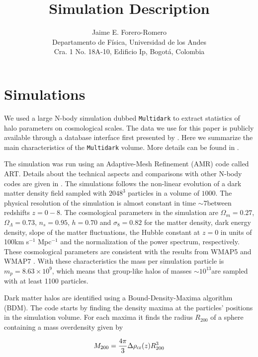 \documentclass{article}
\title{Simulation Description}
\author{Jaime E. Forero-Romero\\ Departamento de F\'{i}sica, Universidad de los Andes\\ Cra. 1 No. 18A-10, Edificio Ip, Bogot\'a, Colombia}
\newcommand{\hMsun}{{\ifmmode{h^{-1}{\rm {M_{\odot}}}}\else{$h^{-1}{\rm{M_{\odot}}}$}\fi}}
\newcommand{\hMpc}{{\ifmmode{h^{-1}{\rm Mpc}}\else{$h^{-1}$Mpc }\fi}}
\newcommand{\hkpc}{{\ifmmode{h^{-1}{\rm kpc}}\else{$h^{-1}$kpc }\fi}}
\begin{document}
\maketitle




   
\section{Simulations}\label{Simulations}

We used a large N-body simulation dubbed \verb"Multidark"
to extract statistics of halo parameters on cosmological scales. The
data we use for this paper is publicly available through a database
interface first presented by \cite{Riebe11}. Here we summarize the
main characteristics of the \verb"Multidark" volume. More details can
be found in \cite{Prada12}.  

The simulation was run using  an Adaptive-Mesh Refinement (AMR) code
called ART. Details about the technical aspects and comparisons with
other N-body codes are given in \cite{Klypin09}.   The simulations
follows the non-linear evolution of a dark matter density field
sampled with $2048^3$ particles in a volume of $1000$\hMpc. The
physical resolution of the simulation is almost constant in time $\sim
7$\hkpc between redshifts $z=0-8$. The cosmological parameters in the
simulation are $\Omega_m=0.27$, $\Omega_{\Lambda}=0.73$, $n_{s}=0.95$,
$h=0.70$ and $\sigma_8=0.82$ for the matter density, dark energy
density, slope of the matter fluctuations, the Hubble constant at
$z=0$ in units of 100km s$^{-1}$ Mpc$^{-1}$ and the normalization of
the power spectrum, respectively.  These cosmological parameters are
consistent with the results from WMAP5 and WMAP7
\citep{Komatsu2009,Jarosik2011}. With these characteristics the mass
per simulation particle is $m_p=8.63\times  10^{9}$\hMsun, which means
that group-like halos of masses $\sim 10^{13}$\hMsun are sampled with
at least 1100 particles.   

Dark matter halos are identified using a Bound-Density-Maxima
algorithm (BDM). The code starts by finding the density maxima at the
particles' positions in the simulation volume. For each maxima
it finds the radius $R_{200}$ of a sphere containing a mass
overdensity given by 

\begin{equation}\label{eq:M200}
M_{200} = \frac{4\pi}{3}\Delta \rho_{\rm cr}(z)R_{200}^{3}
\end{equation}
\end{document}
